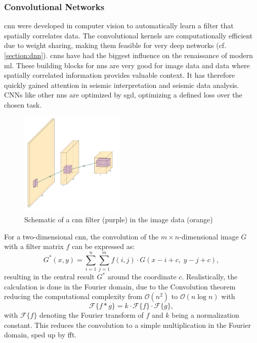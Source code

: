 \subsubsection{Convolutional Networks}
\label{section:cnn}
\acf{cnn} were developed in computer vision to automatically learn a filter that spatially correlates data. The convolutional kernels are computationally efficient due to weight sharing, making them feasible for very deep networks (cf. \cref{section:dnn}). \acp{cnn} have had the biggest influence on the renaissance of modern \ac{ml}. These building blocks for \acp{nn} are very good for image data and data where spatially correlated information provides valuable context. It has therefore quickly gained attention in seismic interpretation and seismic data analysis. CNNs like other \acp{nn} are optimized by \ac{sgd}, optimizing a defined loss over the chosen task.

\begin{figure}[H]
    \centering
    \includegraphics[width=\textwidth,height=5cm,keepaspectratio]{figures/cnn_schema.pdf}
    \caption{Schematic of a \ac{cnn} filter (purple) in the image data (orange)}
    \label{fig:cnn}
\end{figure}

For a two-dimensional \ac{cnn}, the convolution of the $m\times n$-dimensional image $G$ with a filter matrix $f$ can be expressed as:
\begin{equation}
G^{*}(x,y) = \sum_{i=1}^{n} \sum_{j=1}^{m} f(i,j)\cdot G(x-i+c,\; y-j+c),
\end{equation}
resulting in the central result $G^{*}$ around the coordinate $c$. Realistically, the calculation is done in the Fourier domain, due to the Convolution theorem reducing the computational complexity from $\mathcal{O}(n^2)$ to $\mathcal{O}(n \log n)$ with
\begin{equation}
    \mathcal{F}\{f * g\} = k\cdot \mathcal{F}\{f\}\cdot \mathcal{F}\{g\},
\end{equation}
with $\mathcal{F} \{ f\}$ denoting the Fourier transform of $f$ and $k$ being a normalization constant. This reduces the convolution to a simple multiplication in the Fourier domain, sped up by \ac{fft}.

